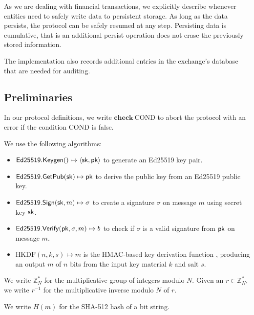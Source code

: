 As we are dealing with financial transactions, we explicitly describe whenever
entities need to safely write data to persistent storage.  As long as the data
persists, the protocol can be safely resumed at any step.  Persisting data is
cumulative, that is an additional persist operation does not erase the
previously stored information.

The implementation also records additional entries in the exchange's database
that are needed for auditing.

\subsection{Preliminaries}
In our protocol definitions, we write $\mathbf{check}\ \mathrm{COND}$ to abort
the protocol with an error if the condition $\mathrm{COND}$ is false.

We use the following algorithms:
\begin{itemize}
\item $\mathsf{Ed25519.Keygen}() \mapsto \langle \mathsf{sk}, \mathsf{pk} \rangle$
    to generate an Ed25519 key pair.
 \item $\mathsf{Ed25519.GetPub}(\mathsf{sk}) \mapsto \mathsf{pk}$ to derive the public key from
    an Ed25519 public key.
 \item $\mathsf{Ed25519.Sign}(\mathsf{sk}, m) \mapsto \sigma$ to create a signature $\sigma$
    on message $m$ using secret key $\mathsf{sk}$.
 \item $\mathsf{Ed25519.Verify}(\mathsf{pk}, \sigma, m) \mapsto b$ to check if $\sigma$ is
   a valid signature from $\mathsf{pk}$ on message $m$.
 \item $\mathrm{HKDF}(n, k, s) \mapsto m$ is the HMAC-based key derivation function \cite{rfc5869},
   producing an output $m$ of $n$ bits from the input key material $k$ and salt $s$.
\end{itemize}

We write $\mathbb{Z}^*_N$ for the multiplicative group of integers modulo $N$.
Given an $r \in \mathbb{Z}^*_N$, we write $r^{-1}$ for the multiplicative
inverse modulo $N$ of $r$.

We write $H(m)$ for the SHA-512 hash of a bit string.

